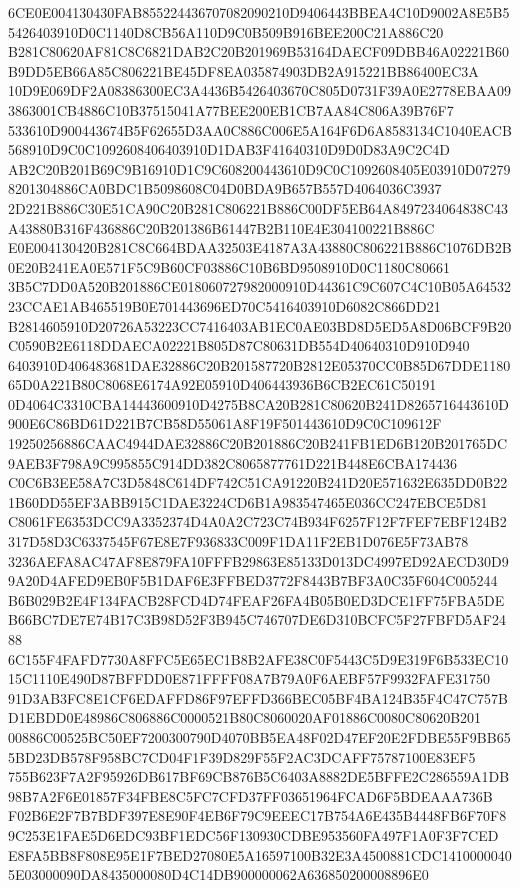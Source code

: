 \documentclass[UTF8,fontset=fandol,zihao=-4,a4paper]{ctexart}
\begin{document}
{{6CE0E004130430FAB855224436707082090210D9406443BBEA4C10D9002A8E5B55426403910D0C1140D8CB56A110D9C0B509B916BEE200C21A886C20
B281C80620AF81C8C6821DAB2C20B201969B53164DAECF09DBB46A02221B60B9DD5EB66A85C806221BE45DF8EA035874903DB2A915221BB86400EC3A
10D9E069DF2A08386300EC3A4436B5426403670C805D0731F39A0E2778EBAA093863001CB4886C10B37515041A77BEE200EB1CB7AA84C806A39B76F7
533610D900443674B5F62655D3AA0C886C006E5A164F6D6A8583134C1040EACB568910D9C0C1092608406403910D1DAB3F41640310D9D0D83A9C2C4D
AB2C20B201B69C9B16910D1C9C608200443610D9C0C1092608405E03910D072798201304886CA0BDC1B5098608C04D0BDA9B657B557D4064036C3937
2D221B886C30E51CA90C20B281C806221B886C00DF5EB64A8497234064838C43A43880B316F436886C20B201386B61447B2B110E4E304100221B886C
E0E004130420B281C8C664BDAA32503E4187A3A43880C806221B886C1076DB2B0E20B241EA0E571F5C9B60CF03886C10B6BD9508910D0C1180C80661
3B5C7DD0A520B201886CE018060727982000910D44361C9C607C4C10B05A6453223CCAE1AB465519B0E701443696ED70C5416403910D6082C866DD21
B2814605910D20726A53223CC7416403AB1EC0AE03BD8D5ED5A8D06BCF9B20C0590B2E6118DDAECA02221B805D87C80631DB554D40640310D910D940
6403910D406483681DAE32886C20B201587720B2812E05370CC0B85D67DDE118065D0A221B80C8068E6174A92E05910D406443936B6CB2EC61C50191
0D4064C3310CBA14443600910D4275B8CA20B281C80620B241D8265716443610D900E6C86BD61D221B7CB58D55061A8F19F501443610D9C0C109612F
19250256886CAAC4944DAE32886C20B201886C20B241FB1ED6B120B201765DC9AEB3F798A9C995855C914DD382C8065877761D221B448E6CBA174436
C0C6B3EE58A7C3D5848C614DF742C51CA91220B241D20E571632E635DD0B221B60DD55EF3ABB915C1DAE3224CD6B1A983547465E036CC247EBCE5D81
C8061FE6353DCC9A3352374D4A0A2C723C74B934F6257F12F7FEF7EBF124B2317D58D3C6337545F67E8E7F936833C009F1DA11F2EB1D076E5F73AB78
3236AEFA8AC47AF8E879FA10FFFB29863E85133D013DC4997ED92AECD30D99A20D4AFED9EB0F5B1DAF6E3FFBED3772F8443B7BF3A0C35F604C005244
B6B029B2E4F134FACB28FCD4D74FEAF26FA4B05B0ED3DCE1FF75FBA5DEB66BC7DE7E74B17C3B98D52F3B945C746707DE6D310BCFC5F27FBFD5AF2488
6C155F4FAFD7730A8FFC5E65EC1B8B2AFE38C0F5443C5D9E319F6B533EC1015C1110E490D87BFFDD0E871FFFF08A7B79A0F6AEBF57F9932FAFE31750
91D3AB3FC8E1CF6EDAFFD86F97EFFD366BEC05BF4BA124B35F4C47C757BD1EBDD0E48986C806886C0000521B80C8060020AF01886C0080C80620B201
00886C00525BC50EF7200300790D4070BB5EA48F02D47EF20E2FDBE55F9BB655BD23DB578F958BC7CD04F1F39D829F55F2AC3DCAFF75787100E83EF5
755B623F7A2F95926DB617BF69CB876B5C6403A8882DE5BFFE2C286559A1DB98B7A2F6E01857F34FBE8C5FC7CFD37FF03651964FCAD6F5BDEAAA736B
F02B6E2F7B7BDF397E8E90F4EB6F79C9EEEC17B754A6E435B4448FB6F70F89C253E1FAE5D6EDC93BF1EDC56F130930CDBE953560FA497F1A0F3F7CED
E8FA5BB8F808E95E1F7BED27080E5A16597100B32E3A4500881CDC14100000405E03000090DA8435000080D4C14DB900000062A636850200008896E0
}}
\end{document}
